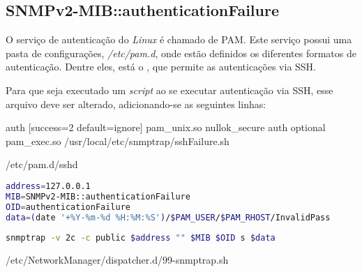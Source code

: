 \documentclass{article}
\begin{document}
\subsection{SNMPv2-MIB::authenticationFailure}
\par O serviço de autenticação do \textit{Linux} é chamado de PAM. Este serviço possui uma pasta de configurações, \textit{/etc/pam.d}, onde estão definidos os diferentes formatos de autenticação. Dentre eles, está o , que permite as autenticações via SSH.

\par Para que seja executado um \textit{script} ao se executar autenticação via SSH, esse arquivo deve ser alterado, adicionando-se as seguintes linhas:

\begin{program}
\begin{myverb}
auth    [success=2 default=ignore]    pam_unix.so nullok_secure
auth    optional                      pam_exec.so /usr/local/etc/snmptrap/sshFailure.sh
\end{myverb}
\caption{/etc/pam.d/sshd}
\end{program}

\begin{program}
  \begin{lstlisting}[language=bash]
address=127.0.0.1
MIB=SNMPv2-MIB::authenticationFailure
OID=authenticationFailure
data=(date '+%Y-%m-%d %H:%M:%S')/$PAM_USER/$PAM_RHOST/InvalidPass
 
snmptrap -v 2c -c public $address "" $MIB $OID s $data
\end{lstlisting}
\caption{/etc/NetworkManager/dispatcher.d/99-snmptrap.sh}
\end{program}
\end{document}
